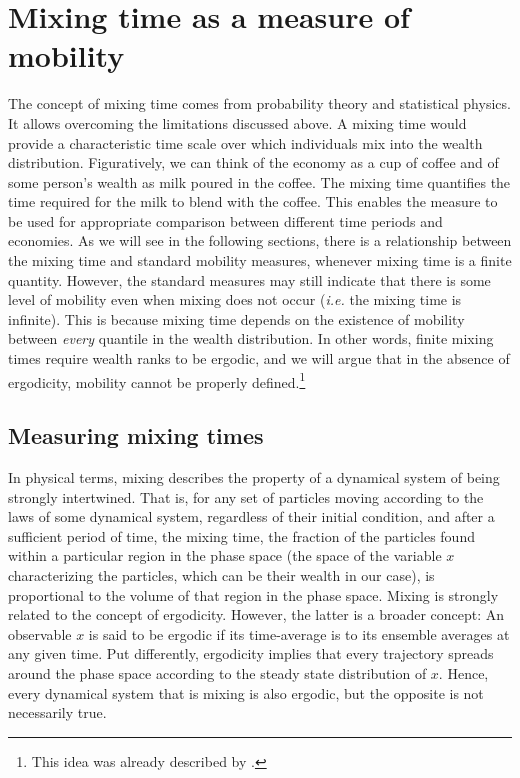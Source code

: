 \documentclass[11pt]{article}
\newcommand{\ie}{{\it i.e.}\xspace}
\numberwithin{equation}{section}
\begin{document}
\section{Mixing time as a measure of mobility}
\label{sec:mixing-time}
The concept of mixing time comes from probability theory and statistical physics. It allows overcoming the limitations discussed above. A mixing time would provide a characteristic time scale over which individuals mix into the wealth distribution. Figuratively, we can think of the economy as a cup of coffee and of some person's wealth as milk poured in the coffee. The mixing time quantifies the time required for the milk to blend with the coffee. This enables the measure to be used for appropriate comparison between different time periods and economies.
As we will see in the following sections, there is a relationship between the mixing time and standard mobility measures, whenever mixing time is a finite quantity. However, the standard measures may still indicate that there is some level of mobility even when mixing does not occur (\ie the mixing time is infinite). This is because mixing time depends on the existence of mobility between \textit{every} quantile in the wealth distribution. In other words, finite mixing times require wealth ranks to be ergodic, and we will argue that in the absence of ergodicity, mobility cannot be properly defined.\footnote{This idea was already described by \citet{Mcfarland1970}.}

\subsection{Measuring mixing times}
In physical terms, mixing describes the property of a dynamical system of being strongly intertwined. That is, for any set of particles moving according to the laws of some dynamical system, regardless of their initial condition, and after a sufficient period of time, the mixing time, the fraction of the particles found within a particular region in the phase space (the space of the variable $x$ characterizing the particles, which can be their wealth in our case), is proportional to the volume of that region in the phase space.
Mixing is strongly related to the concept of ergodicity. However, the latter is a broader concept: An observable $x$ is said to be ergodic if its time-average is to its ensemble averages at any given time. Put differently, ergodicity implies that every trajectory spreads around the phase space according to the steady state distribution of $x$. Hence, every dynamical system that is mixing is also ergodic, but the opposite is not necessarily true.
\end{document}
